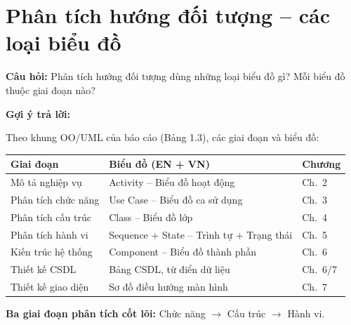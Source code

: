 \documentclass[12pt,a4paper]{article}
\newcommand{\cau}[1]{\textbf{\textcolor{qblue}{Câu hỏi:}} #1}
\newcommand{\traloi}{\par\smallskip\textbf{\textcolor{qblue!70!black}{Gợi ý trả lời:}}\par}
\begin{document}
\section{Phân tích hướng đối tượng -- các loại biểu đồ}

\begin{cauhoi}
\cau{Phân tích hướng đối tượng dùng những loại biểu đồ gì? Mỗi biểu đồ thuộc giai đoạn nào?}
\traloi
Theo khung OO/UML của báo cáo (Bảng 1.3), các giai đoạn và biểu đồ:

\begin{center}
\renewcommand{\arraystretch}{1.25}
\begin{tabular}{|p{3.5cm}|p{6.0cm}|p{2.2cm}|}
\hline
\textbf{Giai đoạn} & \textbf{Biểu đồ (EN + VN)} & \textbf{Chương} \\
\hline
Mô tả nghiệp vụ & Activity -- Biểu đồ hoạt động & Ch.\ 2 \\
\hline
Phân tích chức năng & Use Case -- Biểu đồ ca sử dụng & Ch.\ 3 \\
\hline
Phân tích cấu trúc & Class -- Biểu đồ lớp & Ch.\ 4 \\
\hline
Phân tích hành vi & Sequence + State -- Trình tự + Trạng thái & Ch.\ 5 \\
\hline
Kiến trúc hệ thống & Component -- Biểu đồ thành phần & Ch.\ 6 \\
\hline
Thiết kế CSDL & Bảng CSDL, từ điển dữ liệu & Ch.\ 6/7 \\
\hline
Thiết kế giao diện & Sơ đồ điều hướng màn hình & Ch.\ 7 \\
\hline
\end{tabular}
\end{center}

\textbf{Ba giai đoạn phân tích cốt lõi:} Chức năng $\rightarrow$ Cấu trúc $\rightarrow$ Hành vi.
\end{cauhoi}
\end{document}
